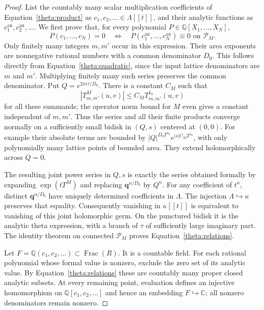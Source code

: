 \documentclass[11pt]{article}
\theoremstyle{definition}
\theoremstyle{remark}
\newcommand{\Q}{\mathbb Q}
\newcommand{\C}{\mathbb C}
\newcommand{\qnov}{\mathbf q}
\numberwithin{equation}{section}
\begin{document}
\begin{proof}
List the countably many scalar multiplication coefficients of
Equation~\eqref{theta:product} as $c_1,c_2,\ldots\in\Lambda[[t]]$,
and their analytic functions as $c_1^{\mathrm{an}},c_2^{\mathrm{an}},\ldots$.
We first prove that, for every polynomial $P\in\Q[X_1,\ldots,X_N]$,
\begin{equation}\label{theta:relations}
 P(c_1,\ldots,c_N)=0
 \quad\Longleftrightarrow\quad
 P(c_1^{\mathrm{an}},\ldots,c_N^{\mathrm{an}})\equiv0
       \text{ on }\mathcal P_M.
\end{equation}
Only finitely many integers $m,m'$ occur in this expression.
Their area exponents are nonnegative rational numbers with a common
denominator $D_0$.  This follows directly from
Equation~\eqref{theta:quadratic}, since the input lattice denominators
are $m$ and $m'$.  Multiplying finitely many such series preserves the
common denominator.  Put $Q=e^{2\pi i\tau/D_0}$.  There is a constant
$C_M$ such that
\[
 |T^M_{m,m'}(u,v)|\leq C_M T^{1_8}_{m,m'}(u,v)
\]
for all these summands; the operator norm bound for $M$ even gives a
constant independent of $m,m'$.  Thus the series and all their finite
products converge normally on a sufficiently small bidisk in $(Q,s)$
centered at $(0,0)$.  For example their absolute terms are bounded by
$|Q|^{D_0T^{1_8}}e^{|s|C_MT^{1_8}}$, with only polynomially many lattice
points of bounded area.  They extend holomorphically across $Q=0$.

The resulting joint power series in $Q,s$ is exactly the series obtained
formally by expanding $\exp(tT^M)$ and replacing
$\qnov^{n/D_0}$ by $Q^n$.  For any coefficient of $t^a$, distinct
$\qnov^{n/D_0}$ have uniquely determined coefficients in $\Lambda$.
The injection $\Lambda\hookrightarrow\kappa$ preserves that equality.
Consequently vanishing in $\kappa[[t]]$ is equivalent to vanishing of
this joint holomorphic germ.  On the punctured bidisk it is the analytic
theta expression, with a branch of $\tau$ of sufficiently large imaginary
part.  The identity theorem on connected $\mathcal P_M$ proves
Equation~\eqref{theta:relations}.

Let $F=\Q(c_1,c_2,\ldots)\subset\operatorname{Frac}(R)$.  It is a
countable field.  For each rational polynomial whose formal value is
nonzero, exclude the zero set of its analytic value.  By
Equation~\eqref{theta:relations} these are countably many proper closed
analytic subsets.  At every remaining point, evaluation defines an
injective homomorphism on $\Q[c_1,c_2,\ldots]$ and hence an embedding
$F\hookrightarrow\C$; all nonzero denominators remain nonzero.


\end{proof}
\end{document}
